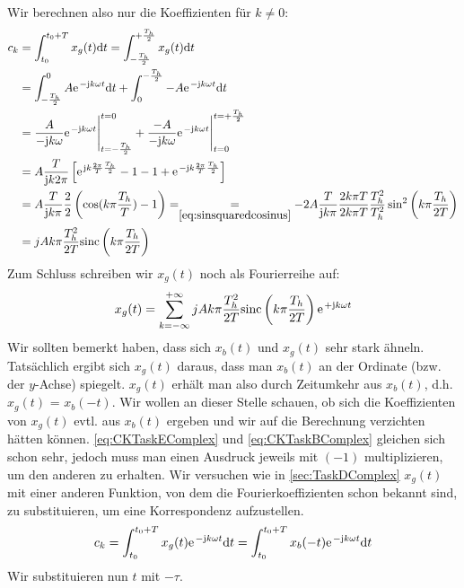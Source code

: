 \documentclass[11pt,a4paper,DIV=12]{scrartcl}
\newcommand{\diff}{\mathrm{d}}
\newcommand{\sinc}{\mathrm{sinc}}
\begin{document}
%
Wir berechnen also nur die Koeffizienten für $k\neq0$:
%
%
%
\begin{align}
	c_k&=\int_{t_0}^{t_0+T}x_{g}(t)\diff t
	=\int_{-\frac{T_h}{2}}^{+\frac{T_h}{2}}x_{g}(t)\diff t \nonumber \\
	&=\int_{-\frac{T_h}{2}}^0A\e^{-\im k \omega t}\diff t+ \int_0^{-\frac{T_h}{2}}-A\e^{-\im k\omega t}\diff t \nonumber \\
	&=\frac{A}{-\im k \omega}\e^{-\im k \omega t}\Bigg |_{t=-\frac{T_h}{2}}^{t=0}+\frac{-A}{-\im k \omega }\e^{-\im k \omega t}\Bigg |_{t=0}^{t=+\frac{T_h}{2}}\nonumber \\
	&=A\frac{T}{\im k2\pi}\left [\e^{\im k \frac{2\pi}{T} \frac{T_h}{2}}-1-1+\e^{-\im k \frac{2\pi}{T} \frac{T_h}{2}}\right ] \nonumber \\
	\label{eq:CKTaskEComplex}
	&=A\frac{T}{\im k\pi}\frac{2}{2}\left (\cos(k\pi\frac{T_h}{T})-1\right )
	=\underset{\ref{eq:sinsquaredcosinus}}{=}-2A\frac{T}{\im k\pi}\frac{2k\pi T}{2k\pi T}\frac{T_h^2}{T_h^2}\sin^2\left(k\pi\frac{T_h}{2T}\right)\nonumber\\
	&=jAk\pi \frac{T_h^2}{2T}\sinc\left(k\pi\frac{T_h}{2T}\right)
\end{align}
%
%
%
Zum Schluss schreiben wir $x_{g}(t)$ noch als Fourierreihe auf:
%
\begin{align}
	x_{g}(t)=\sum_{k=-\infty}^{+\infty}jAk\pi\frac{T_h^2}{2T}\sinc\left(k\pi\frac{T_h}{2T}\right)\e^{+\im k \omega t}
\end{align}
%
Wir sollten bemerkt haben, dass sich $x_{b}(t)$ und $x_{g}(t)$ sehr stark
ähneln.
%
Tatsächlich ergibt sich $x_{g}(t)$ daraus, dass man $x_{b}(t)$ an der Ordinate
(bzw. der $y$-Achse) spiegelt.
%
$x_{g}(t)$ erhält man also durch Zeitumkehr aus $x_{b}(t)$, d.h. $x_{g}(t)$ =
$x_{b}(-t)$.
%
Wir wollen an dieser Stelle schauen, ob sich die Koeffizienten von $x_{g}(t)$
evtl. aus $x_{b}(t)$ ergeben und wir auf die Berechnung verzichten hätten
können.
%
\eqref{eq:CKTaskEComplex} und \eqref{eq:CKTaskBComplex} gleichen sich schon
sehr, jedoch muss man einen Ausdruck jeweils mit $(-1)$ multiplizieren, um den
anderen zu erhalten.
%
Wir versuchen wie in \ref{sec:TaskDComplex} $x_{g}(t)$ mit einer anderen
Funktion, von dem die Fourierkoeffizienten schon bekannt sind, zu
substituieren, um eine Korrespondenz aufzustellen.
%
\begin{align}
	c_k=\int_{t_0}^{t_0+T}x_{g}(t)\e^{-\im k \omega t}\diff t
	= \int_{t_0}^{t_0+T}x_{b}(-t)\e^{-\im k \omega t}\diff t
\end{align}
%
Wir substituieren nun $t$ mit $-\tau$.
\end{document}
